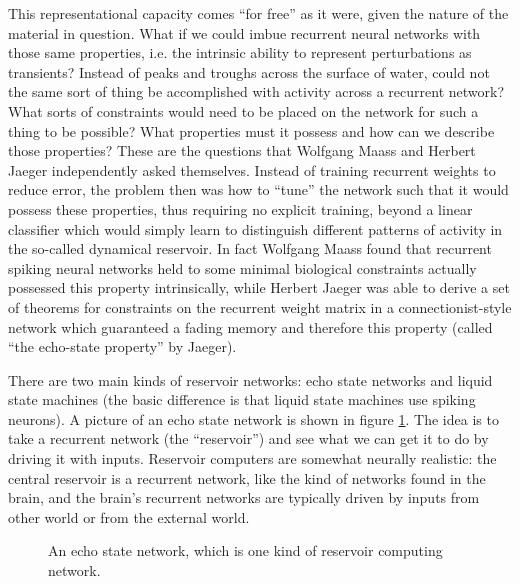 This representational capacity comes ``for free'' as it were, given the nature of the material in question. What if we could imbue recurrent neural networks with those same properties, i.e. the intrinsic ability to represent perturbations as transients? Instead of peaks and troughs across the surface of water, could not the same sort of thing be accomplished with activity across a recurrent network? What sorts of constraints would need to be placed on the network for such a thing to be possible? What properties must it possess and how can we describe those properties? These are the questions that Wolfgang Maass and Herbert Jaeger independently asked themselves. Instead of training recurrent weights to reduce error, the problem then was how to ``tune'' the network such that it would possess these properties, thus requiring no explicit training, beyond a linear classifier which would simply learn to distinguish different patterns of activity in the so-called dynamical reservoir. In fact Wolfgang Maass found that recurrent spiking neural networks held to some minimal biological constraints actually possessed this property intrinsically, while Herbert Jaeger was able to derive a set of theorems for constraints on the recurrent weight matrix in a connectionist-style network which guaranteed a fading memory and therefore this property (called ``the echo-state property'' by Jaeger).

 There are two main kinds of reservoir networks: echo state networks and liquid state machines (the basic difference is that liquid state machines use spiking neurons). A picture of an echo state network is shown in figure \ref{F:esn}. The idea is to take a recurrent network (the ``reservoir'') and see what we can get it to do by driving it with inputs. Reservoir computers are somewhat neurally realistic: the central reservoir is a recurrent network, like the kind of networks found in the brain, and the brain's recurrent networks are typically driven by inputs from other world or from the external world.

\begin{figure}[h]
\centering
{}
\caption[Zo\"e Tosi.]{An echo state network, which is one kind of reservoir computing network.}
\label{F:esn}
\end{figure}

